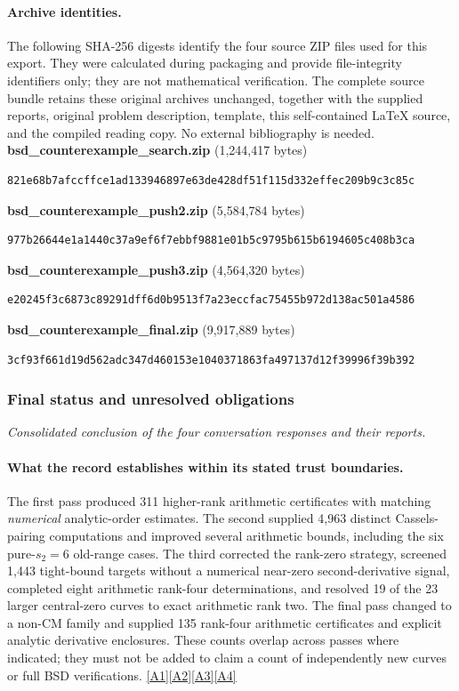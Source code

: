 \documentclass[11pt]{article}
\newcommand{\srcref}[1]{\hyperlink{source:#1}{[#1]}}
\begin{document}
\paragraph{Archive identities.}
The following SHA-256 digests identify the four source ZIP files used for this
export. They were calculated during packaging and provide file-integrity
identifiers only; they are not mathematical verification. The complete source
bundle retains these original archives unchanged, together with the supplied
reports, original problem description, template, this self-contained LaTeX
source, and the compiled reading copy. No external bibliography is needed.
\textbf{bsd\_counterexample\_search.zip} (1,244,417 bytes)
\begin{Verbatim}[breaklines=true,breakanywhere=true,fontsize=\small]
821e68b7afccffce1ad133946897e63de428df51f115d332effec209b9c3c85c
\end{Verbatim}
\textbf{bsd\_counterexample\_push2.zip} (5,584,784 bytes)
\begin{Verbatim}[breaklines=true,breakanywhere=true,fontsize=\small]
977b26644e1a1440c37a9ef6f7ebbf9881e01b5c9795b615b6194605c408b3ca
\end{Verbatim}
\textbf{bsd\_counterexample\_push3.zip} (4,564,320 bytes)
\begin{Verbatim}[breaklines=true,breakanywhere=true,fontsize=\small]
e20245f3c6873c89291dff6d0b9513f7a23eccfac75455b972d138ac501a4586
\end{Verbatim}
\textbf{bsd\_counterexample\_final.zip} (9,917,889 bytes)
\begin{Verbatim}[breaklines=true,breakanywhere=true,fontsize=\small]
3cf93f661d19d562adc347d460153e1040371863fa497137d12f39996f39b392
\end{Verbatim}

\subsubsection{Final status and unresolved obligations}\label{outcome}
\textit{Consolidated conclusion of the four conversation responses and their reports.}


\paragraph{What the record establishes within its stated trust boundaries.}
The first pass produced 311 higher-rank arithmetic certificates with matching
\emph{numerical} analytic-order estimates. The second supplied 4,963 distinct
Cassels-pairing computations and improved several arithmetic bounds, including
the six pure-$s_2=6$ old-range cases. The third corrected the rank-zero strategy,
screened 1,443 tight-bound targets without a numerical near-zero second-derivative
signal, completed eight arithmetic rank-four determinations, and resolved
19 of the 23 larger central-zero curves to exact arithmetic rank two.
The final pass changed to a non-CM family and supplied 135 rank-four arithmetic
certificates and explicit analytic derivative enclosures. These counts overlap
across passes where indicated; they must not be added to claim a count of
independently new curves or full BSD verifications.
\srcref{A1}\srcref{A2}\srcref{A3}\srcref{A4}
\end{document}
